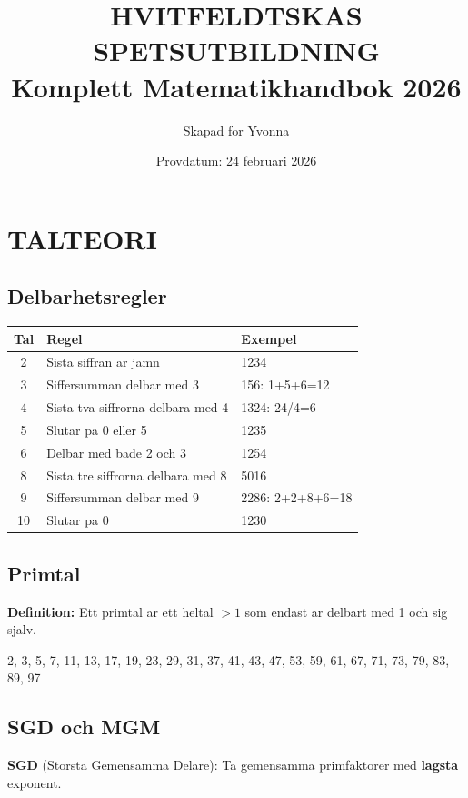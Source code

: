 \documentclass[11pt,a4paper]{article}
\title{\Huge\textbf{HVITFELDTSKAS SPETSUTBILDNING}\\[0.5cm]
\Large Komplett Matematikhandbok 2026}
\author{Skapad for Yvonna}
\date{Provdatum: 24 februari 2026}
\begin{document}
\maketitle
\tableofcontents
\newpage

\section{TALTEORI}

\subsection{Delbarhetsregler}

\begin{tabular}{|c|l|l|}
\hline
\textbf{Tal} & \textbf{Regel} & \textbf{Exempel} \\
\hline
2 & Sista siffran ar jamn & 1234 \\
3 & Siffersumman delbar med 3 & 156: 1+5+6=12 \\
4 & Sista tva siffrorna delbara med 4 & 1324: 24/4=6 \\
5 & Slutar pa 0 eller 5 & 1235 \\
6 & Delbar med bade 2 och 3 & 1254 \\
8 & Sista tre siffrorna delbara med 8 & 5016 \\
9 & Siffersumman delbar med 9 & 2286: 2+2+8+6=18 \\
10 & Slutar pa 0 & 1230 \\
\hline
\end{tabular}

\subsection{Primtal}

\textbf{Definition:} Ett primtal ar ett heltal $> 1$ som endast ar delbart med 1 och sig sjalv.

\begin{tcolorbox}[title=Primtal under 100]
2, 3, 5, 7, 11, 13, 17, 19, 23, 29, 31, 37, 41, 43, 47, 53, 59, 61, 67, 71, 73, 79, 83, 89, 97
\end{tcolorbox}

\subsection{SGD och MGM}

\textbf{SGD} (Storsta Gemensamma Delare): Ta gemensamma primfaktorer med \textbf{lagsta} exponent.
\end{document}

